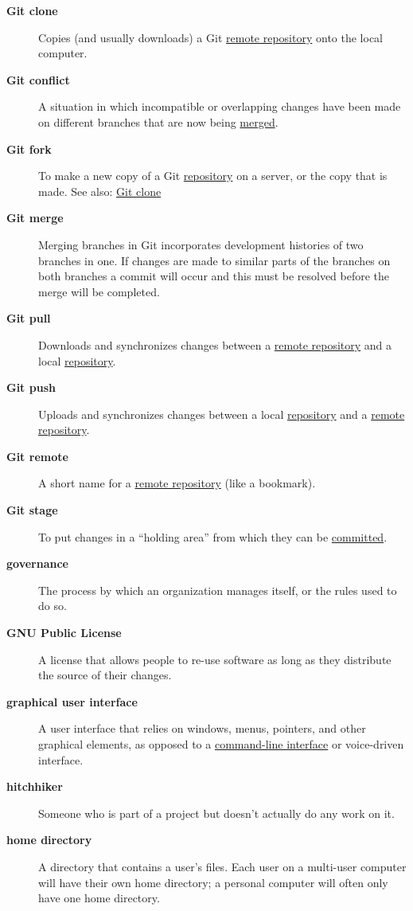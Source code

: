 \documentclass[
]{krantz}
\begin{document}
\begin{description}
\item[\textbf{Git clone}]
Copies (and usually downloads) a Git \protect\hyperlink{remote_repository}{remote repository} onto the local computer.
\item[\textbf{Git conflict}]
A situation in which incompatible or overlapping changes have been made on different branches that are now being \protect\hyperlink{git_merge}{merged}.
\item[\textbf{Git fork}]
To make a new copy of a Git \protect\hyperlink{repository}{repository} on a server, or the copy that is made. See also: \protect\hyperlink{git_clone}{Git clone}
\item[\textbf{Git merge}]
Merging branches in Git incorporates development histories of two branches in one. If changes are made to similar parts of the branches on both branches a commit will occur and this must be resolved before the merge will be completed.
\item[\textbf{Git pull}]
Downloads and synchronizes changes between a \protect\hyperlink{remote_repository}{remote repository} and a local \protect\hyperlink{repository}{repository}.
\item[\textbf{Git push}]
Uploads and synchronizes changes between a local \protect\hyperlink{repository}{repository} and a \protect\hyperlink{remote_repository}{remote repository}.
\item[\textbf{Git remote}]
A short name for a \protect\hyperlink{remote_repository}{remote repository} (like a bookmark).
\item[\textbf{Git stage}]
To put changes in a ``holding area'' from which they can be \protect\hyperlink{commit}{committed}.
\item[\textbf{governance}]
The process by which an organization manages itself, or the rules used to do so.
\item[\textbf{GNU Public License}]
A license that allows people to re-use software as long as they distribute the source of their changes.
\item[\textbf{graphical user interface}]
A user interface that relies on windows, menus, pointers, and other graphical elements, as opposed to a \protect\hyperlink{cli}{command-line interface} or voice-driven interface.
\item[\textbf{hitchhiker}]
Someone who is part of a project but doesn't actually do any work on it.
\item[\textbf{home directory}]
A directory that contains a user's files. Each user on a multi-user computer will have their own home directory; a personal computer will often only have one home directory.

\end{description}
\end{document}
